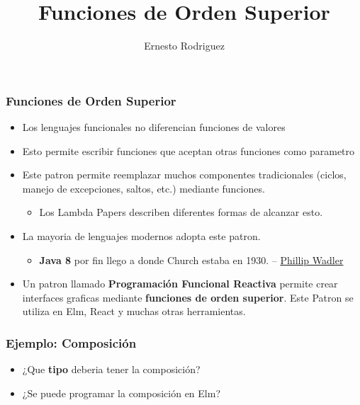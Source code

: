 \documentclass{beamer}
\title[Superior]{Funciones de Orden Superior}
\author{Ernesto Rodriguez}
\institute{
    Universidad del Itsmo \\
    \medskip \textit{erodriguez@unis.edu.gt}
}
\date[\today]{}
\begin{document}
\begin{frame}
    \maketitle
\end{frame}

\begin{frame}
\frametitle{Funciones de Orden Superior}
\begin{itemize}
    \item{Los lenguajes funcionales no diferencian
    funciones de valores}
    \item{Esto permite escribir funciones que aceptan
    otras funciones como parametro}
    \item{Este patron permite reemplazar muchos
    componentes tradicionales (ciclos, manejo de excepciones,
    saltos, etc.) mediante funciones.
    \begin{itemize}
        \item{Los Lambda Papers\cite{LambdaTheUltimate} describen
        diferentes formas de alcanzar esto.}
    \end{itemize}
    }
    \item{La mayoria de lenguajes modernos adopta este patron.
    \begin{itemize}
        \item{{\bf Java 8} por fin llego a donde Church estaba en 1930. -- \href{http://homepages.inf.ed.ac.uk/wadler/}{Phillip Wadler}}
    \end{itemize}
    }
    \item{Un patron llamado {\bf Programaci\'on Funcional Reactiva} permite crear
    interfaces graficas mediante {\bf funciones de orden superior}. Este Patron
    se utiliza en Elm, React y muchas otras herramientas.}
\end{itemize}
\end{frame}

\begin{frame}
\frametitle{Ejemplo: Composici\'on}
\begin{itemize}
    \item{¿Que {\bf tipo} deberia tener la composici\'on?}
    \item{¿Se puede programar la composici\'on en Elm?}
\end{itemize}
\end{frame}
\end{document}
